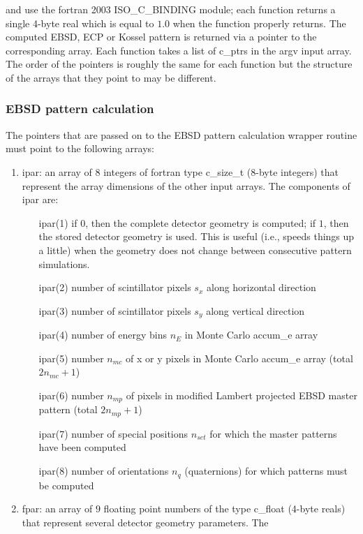 \documentclass[DIV=calc, paper=letter, fontsize=11pt]{scrartcl}	 %
\begin{document}
\noindent and use the fortran 2003 \textsf{ISO\_C\_BINDING} module; each function returns a single 4-byte real which is equal to $1.0$ when the 
function properly returns.  The computed EBSD, ECP or Kossel pattern is returned via a pointer to the corresponding array.  Each function takes a list of \textsf{c\_ptr}s
in the \textsf{argv} input array.  The order of the pointers is roughly the same for each function but the structure of the arrays that they point to 
may be different.  

\subsubsection{EBSD pattern calculation}
The pointers that are passed on to the EBSD pattern calculation wrapper routine must point to the following arrays:
\begin{enumerate}
	\item \textsf{ipar}: an array of $8$ integers of fortran type \textsf{c\_size\_t} ($8$-byte integers) that represent the array dimensions
	of the other input arrays.  The components of \textsf{ipar} are:
		\begin{enumerate}
			\item[\textsf{ipar}(1)] if $0$, then the complete detector geometry is computed; if $1$, then the stored detector geometry is used.  This is useful (i.e., speeds things up a little)
			when the geometry does not change between consecutive pattern simulations.
			\item[\textsf{ipar}(2)] number of scintillator pixels $s_x$ along horizontal direction
			\item[\textsf{ipar}(3)] number of scintillator pixels $s_y$ along vertical direction
			\item[\textsf{ipar}(4)] number of energy bins $n_E$ in Monte Carlo \textsf{accum\_e} array
			\item[\textsf{ipar}(5)] number $n_{mc}$ of x or y pixels in Monte Carlo \textsf{accum\_e} array (total $2n_{mc}+1$)
			\item[\textsf{ipar}(6)] number $n_{mp}$ of pixels in modified Lambert projected EBSD master pattern (total $2n_{mp}+1$)
			\item[\textsf{ipar}(7)] number of special positions $n_{set}$ for which the master patterns have been computed
			\item[\textsf{ipar}(8)] number of orientations $n_q$ (quaternions) for which patterns must be computed
		\end{enumerate}
	\item \textsf{fpar}: an array of $9$ floating point numbers of the type \textsf{c\_float} (4-byte reals) that represent several detector geometry parameters. The 

\end{enumerate}
\end{document}
